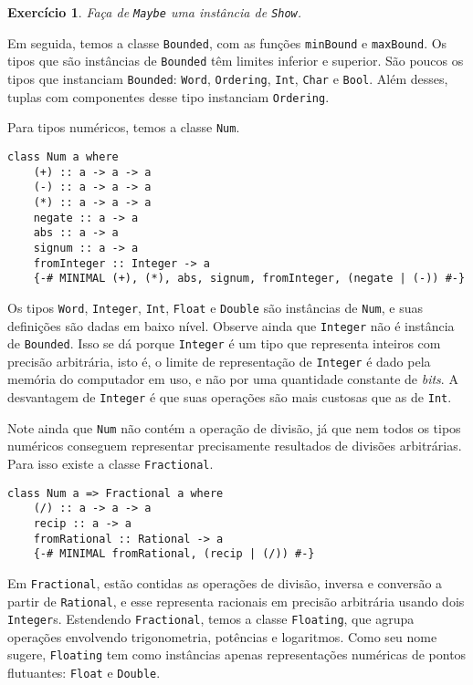 \documentclass[a4paper]{article}
\newtheorem{exercicio}{Exercício}
\begin{document}
\begin{exercicio}
	Faça de \emph{\texttt{Maybe}} uma instância de \emph{\texttt{Show}}.
\end{exercicio}

Em seguida, temos a classe \texttt{Bounded}, com as funções \texttt{minBound} e \texttt{maxBound}.
Os tipos que são instâncias de \texttt{Bounded} têm limites inferior e superior.
São poucos os tipos que instanciam \texttt{Bounded}: \texttt{Word}, \texttt{Ordering}, \texttt{Int}, \texttt{Char} e \texttt{Bool}.
Além desses, tuplas com componentes desse tipo instanciam \texttt{Ordering}.

Para tipos numéricos, temos a classe \texttt{Num}.

\begin{verbatim}
class Num a where
	(+) :: a -> a -> a
	(-) :: a -> a -> a
	(*) :: a -> a -> a
	negate :: a -> a
	abs :: a -> a
	signum :: a -> a
	fromInteger :: Integer -> a
	{-# MINIMAL (+), (*), abs, signum, fromInteger, (negate | (-)) #-}
\end{verbatim}

Os tipos \texttt{Word}, \texttt{Integer}, \texttt{Int}, \texttt{Float} e \texttt{Double} são instâncias de \texttt{Num}, e suas definições são dadas em baixo nível.
Observe ainda que \texttt{Integer} não é instância de \texttt{Bounded}.
Isso se dá porque \texttt{Integer} é um tipo que representa inteiros com precisão arbitrária, isto é, o limite de representação de \texttt{Integer} é dado pela memória do computador em uso, e não por uma quantidade constante de \emph{bits}.
A desvantagem de \texttt{Integer} é que suas operações são mais custosas que as de \texttt{Int}.

Note ainda que \texttt{Num} não contém a operação de divisão, já que nem todos os tipos numéricos conseguem representar precisamente resultados de divisões arbitrárias.
Para isso existe a classe \texttt{Fractional}.

\begin{verbatim}
class Num a => Fractional a where
	(/) :: a -> a -> a
	recip :: a -> a
	fromRational :: Rational -> a
	{-# MINIMAL fromRational, (recip | (/)) #-}
\end{verbatim}

Em \texttt{Fractional}, estão contidas as operações de divisão, inversa e conversão a partir de \texttt{Rational}, e esse representa racionais em precisão arbitrária usando dois \texttt{Integer}s.
Estendendo \texttt{Fractional}, temos a classe \texttt{Floating}, que agrupa operações envolvendo trigonometria, potências e logaritmos.
Como seu nome sugere, \texttt{Floating} tem como instâncias apenas representações numéricas de pontos flutuantes: \texttt{Float} e \texttt{Double}.
\end{document}
